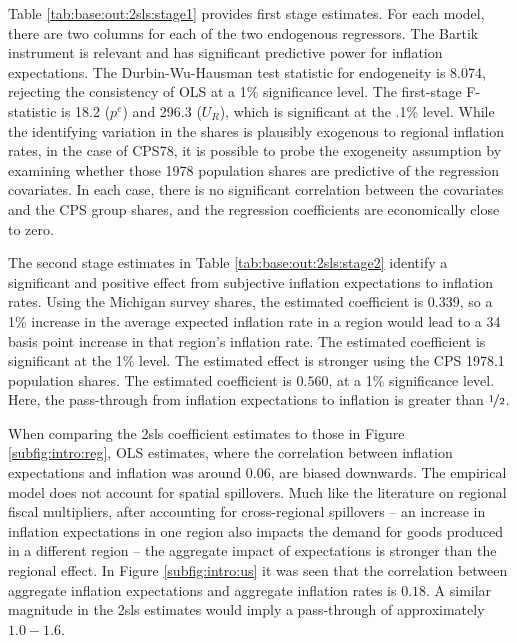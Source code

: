 \documentclass[12pt]{article}
\begin{document}



Table \ref{tab:base:out:2sls:stage1} provides first stage estimates. For each model, there are two columns for each of the two endogenous regressors. The Bartik instrument is relevant and has significant predictive power for inflation expectations. The Durbin-Wu-Hausman test statistic for endogeneity is 8.074, rejecting the consistency of OLS at a 1\% significance level. The first-stage F-statistic is 18.2 ($p^e$) and 296.3 ($U_R$), which is significant at the .1\% level. While the identifying variation in the shares is plausibly exogenous to regional inflation rates, in the case of CPS78, it is possible to probe the exogeneity assumption by examining whether those 1978 population shares are predictive of the regression covariates. In each case, there is no significant correlation between the covariates and the CPS group shares, and the regression coefficients are economically close to zero.

The second stage estimates in Table \ref{tab:base:out:2sls:stage2} identify a significant and positive effect from subjective inflation expectations to inflation rates. Using the Michigan survey shares, the estimated coefficient is $0.339$, so a 1\% increase in the average expected inflation rate in a region would lead to a 34 basis point increase in that region's inflation rate. The estimated coefficient is significant at the 1\% level. The estimated effect is stronger using the CPS 1978.1 population shares. The estimated coefficient is $0.560$, at a 1\% significance level. Here, the pass-through from inflation expectations to inflation is greater than $\nicefrac{1}{2}$.  

When comparing the 2sls coefficient estimates to those in Figure \ref{subfig:intro:reg}, OLS estimates, where the correlation between inflation expectations and inflation was around $0.06$, are biased downwards. The empirical model does not account for spatial spillovers. Much like the literature on regional fiscal multipliers, after accounting for cross-regional spillovers -- an increase in inflation expectations in one region also impacts the demand for goods produced in a different region -- the aggregate impact of expectations is stronger than the regional effect. In Figure \ref{subfig:intro:us} it was seen that the correlation between aggregate inflation expectations and aggregate inflation rates is $0.18$. A similar magnitude in the 2sls estimates would imply a pass-through of approximately $1.0-1.6$.  
\end{document}
